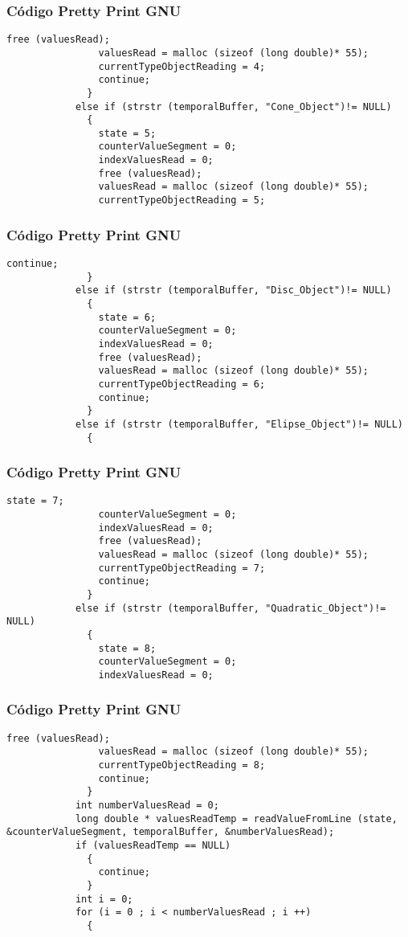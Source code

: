 \documentclass{beamer}
\begin{document}
\begin{frame}[fragile]
\frametitle{C\'odigo Pretty Print GNU}
\begin{lstlisting}[style=CStyle]
                free (valuesRead);
                valuesRead = malloc (sizeof (long double)* 55);
                currentTypeObjectReading = 4;
                continue;
              }
            else if (strstr (temporalBuffer, "Cone_Object")!= NULL)
              {
                state = 5;
                counterValueSegment = 0;
                indexValuesRead = 0;
                free (valuesRead);
                valuesRead = malloc (sizeof (long double)* 55);
                currentTypeObjectReading = 5;
\end{lstlisting}
\end{frame}
\begin{frame}[fragile]
\frametitle{C\'odigo Pretty Print GNU}
\begin{lstlisting}[style=CStyle]
                continue;
              }
            else if (strstr (temporalBuffer, "Disc_Object")!= NULL)
              {
                state = 6;
                counterValueSegment = 0;
                indexValuesRead = 0;
                free (valuesRead);
                valuesRead = malloc (sizeof (long double)* 55);
                currentTypeObjectReading = 6;
                continue;
              }
            else if (strstr (temporalBuffer, "Elipse_Object")!= NULL)
              {
                \end{lstlisting}
\end{frame}
\begin{frame}[fragile]
\frametitle{C\'odigo Pretty Print GNU}
\begin{lstlisting}[style=CStyle]
                state = 7;
                counterValueSegment = 0;
                indexValuesRead = 0;
                free (valuesRead);
                valuesRead = malloc (sizeof (long double)* 55);
                currentTypeObjectReading = 7;
                continue;
              }
            else if (strstr (temporalBuffer, "Quadratic_Object")!= NULL)
              {
                state = 8;
                counterValueSegment = 0;
                indexValuesRead = 0;
\end{lstlisting}
\end{frame}
\begin{frame}[fragile]
\frametitle{C\'odigo Pretty Print GNU}
\begin{lstlisting}[style=CStyle]
                free (valuesRead);
                valuesRead = malloc (sizeof (long double)* 55);
                currentTypeObjectReading = 8;
                continue;
              }
            int numberValuesRead = 0;
            long double * valuesReadTemp = readValueFromLine (state, &counterValueSegment, temporalBuffer, &numberValuesRead);
            if (valuesReadTemp == NULL)
              {
                continue;
              }
            int i = 0;
            for (i = 0 ; i < numberValuesRead ; i ++)
              {
                \end{lstlisting}
\end{frame}
\end{document}
